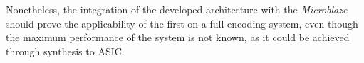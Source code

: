 Nonetheless, the integration of the developed architecture with the \emph{Microblaze} should prove the applicability of the first on a full encoding system, even though the maximum performance of the system is not known, as it could be achieved through synthesis to ASIC.





\clearpage
\printbibliography[heading=subbibliography]
